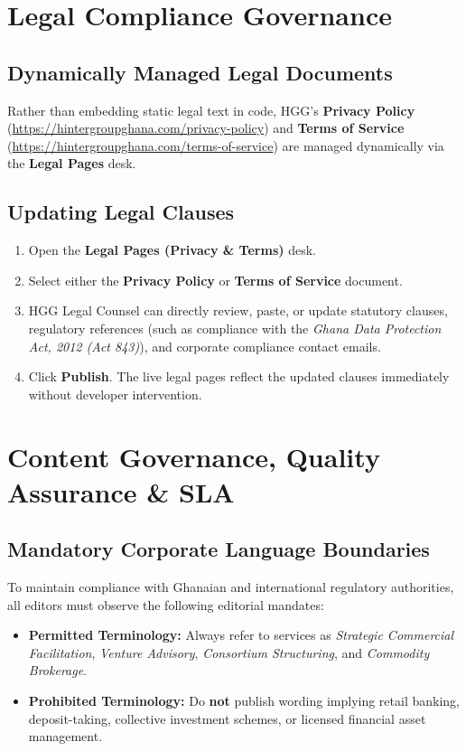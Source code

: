 \documentclass[11pt,a4paper,oneside]{book}
\begin{document}
\chapter{Legal Compliance Governance}
\label{chap:legal}

\section{Dynamically Managed Legal Documents}
Rather than embedding static legal text in code, HGG’s \textbf{Privacy Policy} (\url{https://hintergroupghana.com/privacy-policy}) and \textbf{Terms of Service} (\url{https://hintergroupghana.com/terms-of-service}) are managed dynamically via the \textbf{Legal Pages} desk.

\section{Updating Legal Clauses}
\begin{enumerate}[leftmargin=*,label=\textbf{Step \arabic*:}]
  \item Open the \textbf{Legal Pages (Privacy \& Terms)} desk.
  \item Select either the \textbf{Privacy Policy} or \textbf{Terms of Service} document.
  \item HGG Legal Counsel can directly review, paste, or update statutory clauses, regulatory references (such as compliance with the \textit{Ghana Data Protection Act, 2012 (Act 843)}), and corporate compliance contact emails.
  \item Click \textbf{Publish}. The live legal pages reflect the updated clauses immediately without developer intervention.
\end{enumerate}

\chapter{Content Governance, Quality Assurance \& SLA}
\label{chap:governance}

\section{Mandatory Corporate Language Boundaries}
To maintain compliance with Ghanaian and international regulatory authorities, all editors must observe the following editorial mandates:
\begin{itemize}
  \item \textbf{Permitted Terminology:} Always refer to services as \textit{Strategic Commercial Facilitation}, \textit{Venture Advisory}, \textit{Consortium Structuring}, and \textit{Commodity Brokerage}.
  \item \textbf{Prohibited Terminology:} Do \textbf{not} publish wording implying retail banking, deposit-taking, collective investment schemes, or licensed financial asset management.
\end{itemize}
\end{document}
